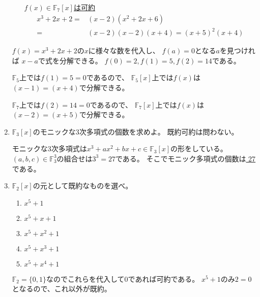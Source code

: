 \documentclass[10pt,b5paper]{ltjsarticle}
\begin{document}
\begin{enumerate}
\begin{enumerate}
             \underline{$f(x) \in \mathbb{F}_{7}[x]$は可約}
             \begin{align}
              x^3 + 2x +2 =& (x-2)(x^2+2x+6)\\
               =& (x-2)(x-2)(x+4) = (x+5)^2(x+4)
             \end{align}
      \end{enumerate}

      \dotfill

      $f(x)=x^3+2x+2$の$x$に様々な数を代入し、
      $f(a)=0$となる$a$を見つければ
      $x-a$で式を分解できる。
      $f(0)=2, f(1)=5, f(2)=14$である。

      $\mathbb{F}_{5}$上では$f(1)=5=0$であるので、
      $\mathbb{F}_{5}[x]$上では$f(x)$は$(x-1)=(x+4)$で分解できる。

      $\mathbb{F}_{7}$上では$f(2)=14=0$であるので、
      $\mathbb{F}_{7}[x]$上では$f(x)$は$(x-2)=(x+5)$で分解できる。

      \hrulefill
 \item
      $\mathbb{F}_{3}[x]$のモニックな3次多項式の個数を求めよ。
      既約可約は問わない。


      モニックな3次多項式は$x^3+ax^2+bx+c\in\mathbb{F}_{3}[x]$の形をしている。
      $(a,b,c)\in\mathbb{F}_{3}^3$の組合せは$3^3=27$である。
      そこでモニック多項式の個数は\underline{ 27 }である。

      \hrulefill
 \item
      $\mathbb{F}_{2}[x]$の元として既約なものを選べ。
      \begin{enumerate}
       \item $x^5+1$
       \item $x^5+x+1$
       \item $x^5+x^2+1$
       \item $x^5+x^3+1$
       \item $x^5+x^4+1$
      \end{enumerate}
      $\mathbb{F}_2=\{0,1\}$なのでこれらを代入して$0$であれば可約である。
      $x^5+1$のみ$2=0$となるので、これ以外が既約。
\end{enumerate}
\end{document}

